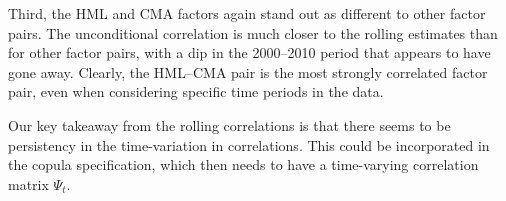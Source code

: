 Third, the HML and CMA factors again stand out as different to other factor pairs. The unconditional correlation is much closer to the rolling estimates than for other factor pairs, with a dip in the 2000--2010 period that appears to have gone away. Clearly, the HML--CMA pair is the most strongly correlated factor pair, even when considering specific time periods in the data.

Our key takeaway from the rolling correlations is that there seems to be persistency in the time-variation in correlations. This could be incorporated in the copula specification, which then needs to have a time-varying correlation matrix $\Psi_t$.




\label{sub:threshold_and_rolling_correlations_of_residuals}

